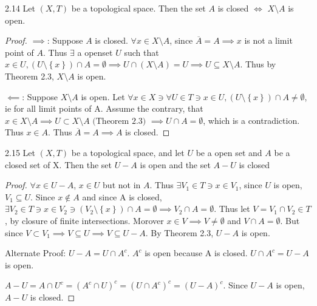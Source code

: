 \documentclass{article}
\begin{document}
\bigskip

\begin{claim}{2.14}\label{Claim 2.14.}
    Let $(X, T)$ be a topological space. Then the set $A$ is closed $\iff$ $X \setminus A$ is open.     
\end{claim}
\begin{proof}
    $\implies$: Suppose $A$ is closed. $\forall x \in X \setminus A$, since $\overline{A} = A \implies x$ is not a limit point of $A$. Thus $\exists$ a openset $U$ such that $x \in U, (U \setminus \left\{ x \right\}) \cap A = \emptyset \implies U \cap \left(X \setminus A\right) = U \implies U \subseteq X \setminus A$. Thus by Theorem 2.3, $X \setminus A$ is open. 
    
    $\impliedby$: Suppose $X \setminus A$ is open. Let $\forall x \in X \ni \forall U \in T \ni x \in U, \left(U \setminus \left\{ x \right\}\right) \cap A \neq \emptyset$, ie for all limit points of A. Assume the contrary, that $x \in X \setminus A \implies U \subset X \setminus A \text{ (Theorem 2.3) } \implies U \cap A= \emptyset$, which is a contradiction. Thus $x \in A$. Thus $\overline{A} = A \implies A$ is closed.       
\end{proof}

\bigskip

\begin{claim}{2.15}\label{Claim 2.15.}
    Let $(X, T)$ be a topological space, and let $U$ be a open set and $A$ be a closed set of X. Then the set $U - A$ is open and the set $A - U$ is closed      
\end{claim}
\begin{proof}
    $\forall x \in U - A$, $x \in U$ but not in $A$. Thus $\exists V_1 \in T \ni x \in V_1$, since $U$ is open, $V_1 \subseteq U$. Since $x \not \in A$ and since A is closed, $\exists V_2 \in T \ni x \in V_2 \ni (V_2 \setminus \left\{ x \right\})\cap A = \emptyset \implies V_2 \cap A = \emptyset$. Thus let $V = V_1 \cap V_2 \in T$, by closure of finite intersections. Morover $x \in V \implies V \neq \emptyset$ and $V \cap A = \emptyset$. But since $V \subset V_1 \implies V \subseteq U \implies V \subseteq U - A $. By Theorem 2.3, $U - A$ is open. 

    Alternate Proof: $U - A = U \cap A^c$. $A^c$ is open because A is closed. $U \cap A^c = U - A$ is open.   
    
    $A - U = A \cap U^c = (A^c \cap U)^c = (U \cap A^c)^c = (U - A)^c$. Since $U - A$ is open, $A - U$ is closed.     
\end{proof}
\end{document}
